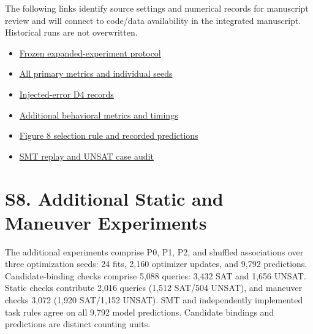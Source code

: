\documentclass[11pt,a4paper]{article}
\begin{document}
The following links identify source settings and numerical records for manuscript review and will connect to code/data availability in the integrated manuscript. Historical runs are not overwritten.\par

\begin{itemize}\setlength{\itemsep}{0pt}\setlength{\parsep}{0pt}\setlength{\topsep}{2pt}
\item \href{\detokenize{projects/04-guardsynth-coc/artifacts/public/paper1-method-preservation-001/temporal-expansion-protocol-2026-09-29-001/protocol.json}}{Frozen expanded-experiment protocol}
\item \href{\detokenize{projects/04-guardsynth-coc/artifacts/public/paper1-method-preservation-001/temporal-experiment-closure-2026-09-29-001/all_primary_metrics.csv}}{All primary metrics and individual seeds}
\item \href{\detokenize{projects/04-guardsynth-coc/artifacts/public/paper1-temporal-diversity-001/diversity-analysis-2026-09-29-001/RESULT.json}}{Injected-error D4 records}
\item \href{\detokenize{projects/04-guardsynth-coc/artifacts/public/paper1-method-preservation-001/temporal-secondary-metrics-2026-09-29-001/RESULT.json}}{Additional behavioral metrics and timings}
\item \href{\detokenize{projects/04-guardsynth-coc/artifacts/public/paper1-method-preservation-001/experiments-section-2026-09-30-002/selected_cases.json}}{Figure 8 selection rule and recorded predictions}
\end{itemize}

\begin{itemize}\setlength{\itemsep}{0pt}\setlength{\parsep}{0pt}\setlength{\topsep}{2pt}
\item \href{\detokenize{projects/04-guardsynth-coc/artifacts/public/paper1-method-preservation-001/experiments-section-2026-09-30-002/unsat_review.json}}{SMT replay and UNSAT case audit}
\end{itemize}


\endgroup
\section*{S8. Additional Static and Maneuver Experiments}

The additional experiments comprise P0, P1, P2, and shuffled associations over three optimization seeds: 24 fits, 2,160 optimizer updates, and 9,792 predictions. Candidate-binding checks comprise 5,088 queries: 3,432 SAT and 1,656 UNSAT. Static checks contribute 2,016 queries (1,512 SAT/504 UNSAT), and maneuver checks 3,072 (1,920 SAT/1,152 UNSAT). SMT and independently implemented task rules agree on all 9,792 model predictions. Candidate bindings and predictions are distinct counting units.\par
\end{document}
